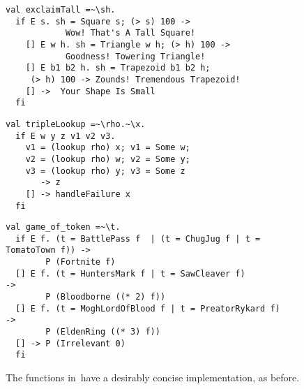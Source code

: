 \documentclass[manuscript,screen 12pt, nonacm]{acmart}
\begin{document}
    
    \begin{figure}[ht] 
      \begin{minipage}[h]{0.54\linewidth}
        \vmlst 
        \begin{lstlisting}[numbers=none, basicstyle=\tiny, xleftmargin=.2em,
          showstringspaces=false,
          frame=single]
val exclaimTall =~\sh.
  if E s. sh = Square s; (> s) 100 -> 
            Wow! That's A Tall Square!  
    [] E w h. sh = Triangle w h; (> h) 100 ->
            Goodness! Towering Triangle!
    [] E b1 b2 h. sh = Trapezoid b1 b2 h; 
     (> h) 100 -> Zounds! Tremendous Trapezoid!
    [] ->  Your Shape Is Small
  fi 
  \end{lstlisting}
          \label{fig:vmexclaimtall} 
      \end{minipage}%
      \begin{minipage}[h]{0.5\linewidth}
        \vmlst 
        \begin{lstlisting}[numbers=none, basicstyle=\tiny, xleftmargin=2em,
                      frame=single]
val tripleLookup =~\rho.~\x.
  if E w y z v1 v2 v3. 
    v1 = (lookup rho) x; v1 = Some w; 
    v2 = (lookup rho) w; v2 = Some y; 
    v3 = (lookup rho) y; v3 = Some z 
       -> z 
    [] -> handleFailure x
  fi 
   \end{lstlisting}
            \label{fig:vmtriplelookup} 
        \vspace{4ex}
      \end{minipage} 
      \begin{minipage}[h]{\linewidth}
        \vmlst 
        \begin{lstlisting}[numbers=none, basicstyle=\tiny, xleftmargin=9em,
          showstringspaces=false,
          frame=single]
val game_of_token =~\t. 
  if E f. (t = BattlePass f  | (t = ChugJug f | t = TomatoTown f)) -> 
        P (Fortnite f)
  [] E f. (t = HuntersMark f | t = SawCleaver f)                   -> 
        P (Bloodborne ((* 2) f))
  [] E f. (t = MoghLordOfBlood f | t = PreatorRykard f)            -> 
        P (EldenRing ((* 3) f))
  [] -> P (Irrelevant 0)
  fi 
\end{lstlisting}
          \label{fig:vmgot}
      \vspace{4ex}
      \end{minipage}%
      \caption{The functions in~\VMinus have a desirably concise
      implementation, as before.}
  \label{fig:vminusfuncs}
    \end{figure}   
\end{document}
